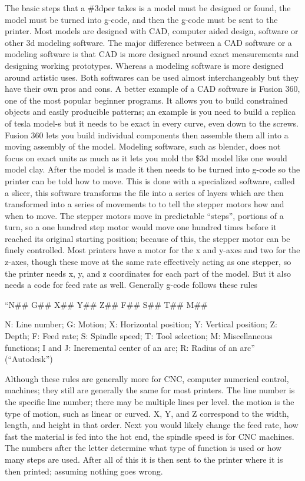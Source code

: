 \documentclass[12pt]{article}
\begin{document}
\begin{flushleft}
The basic steps that a \#3dper takes is a model must be designed or found, the model must be turned into g-code, and then the g-code must be sent to the printer. Most models are designed with CAD, computer aided design, software or other 3d modeling software. The major difference between a CAD software or a modeling software is that CAD is more designed around exact measurements and designing working prototypes. Whereas a modeling software is more designed around artistic uses. Both softwares can be used almost interchangeably but they have their own pros and cons. A better example of a CAD software is Fusion 360, one of the most popular beginner programs. It allows you to build constrained objects and easily producible patterns; an example is you need to build a replica of tesla model-s but it needs to be exact in every curve, even down to the screws. Fusion 360 lets you build individual components then assemble them all into a moving assembly of the model. Modeling software, such as blender, does not focus on exact units as much as it lets you mold the \$3d model like one would model clay. After the model is made it then needs to be turned into g-code so the printer can be told how to move. This is done with a specialized software, called a slicer, this software transforms the file into a series of layers which are then transformed into a series of movements to to tell the stepper motors how and when to move. The stepper motors move in predictable ``steps'', portions of a turn, so a one hundred step motor would move one hundred times before it reached its original starting position; because of this, the stepper motor can be finely controlled. Most printers have a motor for the x and y-axes and two for the z-axes, though these move at the same rate effectively acting as one stepper, so the printer needs x, y, and z coordinates for each part of the model. But it also needs a code for feed rate as well. Generally g-code follows these rules
\begin{displayquote}
``N\#\# G\#\# X\#\# Y\#\# Z\#\# F\#\# S\#\# T\#\# M\#\#

N: Line number; G: Motion; X: Horizontal position; Y: Vertical position; Z: Depth; F: Feed rate; S: Spindle speed; T: Tool selection; M: Miscellaneous functions; I and J: Incremental center of an arc; R: Radius of an arc'' (``Autodesk'') 
\end{displayquote}
Although these rules are generally more for CNC, computer numerical control, machines; they still are generally the same for most printers. The line number is the specific line number; there may be multiple lines per level. the motion is the type of motion, such as linear or curved. X, Y, and Z correspond to the width, length, and height in that order. Next you would likely change the feed rate, how fast the material is fed into the hot end, the spindle speed is for CNC machines. The numbers after the letter determine what type of function is used or how many steps are used. After all of this it is then sent to the printer where it is then printed; assuming nothing goes wrong.


\end{flushleft}
\end{document}

